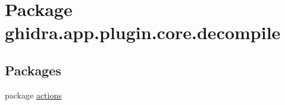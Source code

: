 \hypertarget{namespaceghidra_1_1app_1_1plugin_1_1core_1_1decompile}{}\section{Package ghidra.\+app.\+plugin.\+core.\+decompile}
\label{namespaceghidra_1_1app_1_1plugin_1_1core_1_1decompile}
\subsection*{Packages}
\begin{DoxyCompactItemize}
\item 
package \mbox{\hyperlink{namespaceghidra_1_1app_1_1plugin_1_1core_1_1decompile_1_1actions}{actions}}
\end{DoxyCompactItemize}
